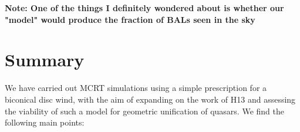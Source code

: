 \documentclass[useAMS,usenatbib]{mn2e_x}
\begin{document}




{\bf Note: One of the things I definitely wondered about is whether our "model" would produce the fraction of BALs seen in the sky}





\section{Summary}

We have carried out MCRT simulations using a simple
prescription for a biconical disc wind, with
the aim of expanding on the work of H13 and assessing 
the viability of such a model for geometric unification of quasars.
We find the following main points:
\end{document}
